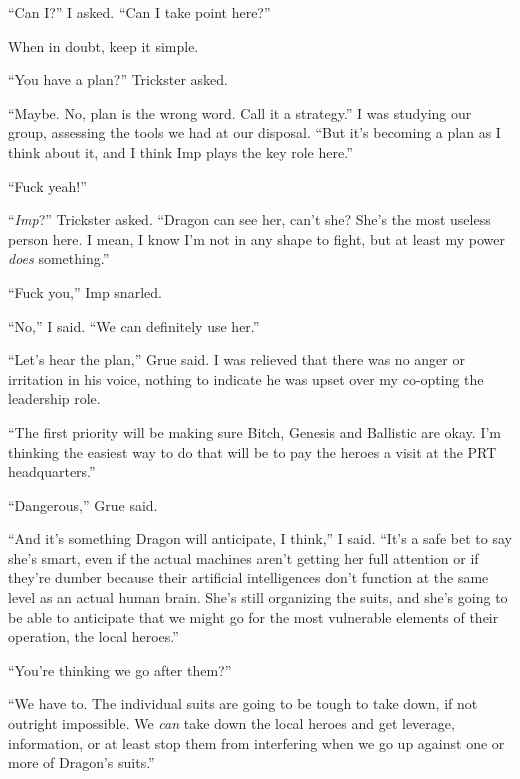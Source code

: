 ``Can I?''  I asked.  ``Can I take point here?''



When in doubt, keep it simple.



``You have a plan?'' Trickster asked.



``Maybe.  No, plan is the wrong word.  Call it a strategy.''  I was studying our group, assessing the tools we had at our disposal.  ``But it's becoming a plan as I think about it, and I think Imp plays the key role here.''



``Fuck yeah!''



``\emph{Imp}?'' Trickster asked.  ``Dragon can see her, can't she?  She's the most useless person here.  I mean, I know I'm not in any shape to fight, but at least my power \emph{does} something.''



``Fuck you,'' Imp snarled.



``No,'' I said.  ``We can definitely use her.''



``Let's hear the plan,'' Grue said.  I was relieved that there was no anger or irritation in his voice, nothing to indicate he was upset over my co-opting the leadership role.



``The first priority will be making sure Bitch, Genesis and Ballistic are okay.  I'm thinking the easiest way to do that will be to pay the heroes a visit at the PRT headquarters.''



``Dangerous,'' Grue said.



``And it's something Dragon will anticipate, I think,'' I said.  ``It's a safe bet to say she's smart, even if the actual machines aren't getting her full attention or if they're dumber because their artificial intelligences don't function at the same level as an actual human brain.  She's still organizing the suits, and she's going to be able to anticipate that we might go for the most vulnerable elements of their operation, the local heroes.''



``You're thinking we go after them?''



``We have to.  The individual suits are going to be tough to take down, if not outright impossible.  We \emph{can} take down the local heroes and get leverage, information, or at least stop them from interfering when we go up against one or more of Dragon's suits.''



